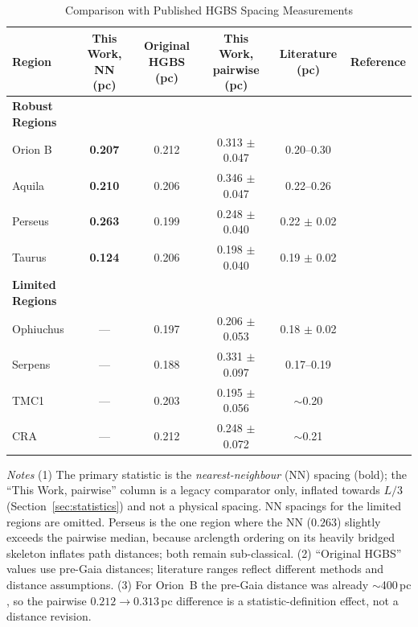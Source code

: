 \documentclass[usenatbib,twoside,twocolumn]{mnras}
\begin{document}
\begin{table}
\caption{Comparison with Published HGBS Spacing Measurements}
\label{tab:literature}
\begin{tabular}{lccccc}
\toprule
Region & This Work, NN (pc) & Original HGBS (pc) & This Work, pairwise (pc) & Literature (pc) & Reference \\
\midrule
\textbf{Robust Regions} &  &  &  &  &  \\
Orion B & \textbf{0.207} & 0.212 & 0.313 $\pm$ 0.047 & 0.20--0.30 & \citet{Konyves2020} \\
Aquila  & \textbf{0.210} & 0.206 & 0.346 $\pm$ 0.047 & 0.22--0.26 & \citet{Konyves2015} \\
Perseus & \textbf{0.263} & 0.199 & 0.248 $\pm$ 0.040 & 0.22 $\pm$ 0.02 & \citet{Pezzuto2021} \\
Taurus  & \textbf{0.124} & 0.206 & 0.198 $\pm$ 0.040 & 0.19 $\pm$ 0.02 & \citet{Hacar2013} \\
\midrule
\textbf{Limited Regions} &  &  &  &  &  \\
Ophiuchus & --- & 0.197 & 0.206 $\pm$ 0.053 & 0.18 $\pm$ 0.02 & \citet{Konyves2020} \\
Serpens  & --- & 0.188 & 0.331 $\pm$ 0.097 & 0.17--0.19 & \citet{Konyves2020} \\
TMC1     & --- & 0.203 & 0.195 $\pm$ 0.056 & $\sim$0.20 & \citet{Hacar2013} \\
CRA      & --- & 0.212 & 0.248 $\pm$ 0.072 & $\sim$0.21 & \citet{Konyves2020} \\
\bottomrule
\end{tabular}

\vspace{0.1in}
\footnotesize
\emph{Notes} (1) The primary statistic is the \emph{nearest-neighbour} (NN) spacing (bold); the ``This Work, pairwise'' column is a legacy comparator only, inflated towards $L/3$ (Section~\ref{sec:statistics}) and not a physical spacing. NN spacings for the limited regions are omitted. Perseus is the one region where the NN ($0.263$) slightly exceeds the pairwise median, because arclength ordering on its heavily bridged skeleton inflates path distances; both remain sub-classical. (2) ``Original HGBS'' values use pre-Gaia distances; literature ranges reflect different methods and distance assumptions. (3) For Orion~B the pre-Gaia distance was already $\sim$400\,pc \citep{Konyves2020}, so the pairwise $0.212\to0.313$\,pc difference is a statistic-definition effect, not a distance revision.
\end{table}
\end{document}

